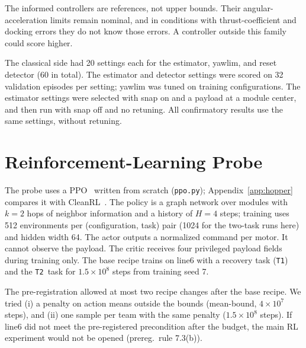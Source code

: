 \documentclass[conference]{IEEEtran}
\newcommand{\TT}{\texttt{T2}}
\begin{document}
The informed controllers are references, not upper bounds.
Their angular-acceleration limits remain nominal, and in conditions with thrust-coefficient and docking errors they do not know those errors. %
A controller outside this family could score higher.

The classical side had 20 settings each for the estimator, yawlim, and reset detector (60 in total). %
The estimator and detector settings were scored on 32 validation episodes per setting; yawlim was tuned on training configurations. %
The estimator settings were selected with snap on and a payload at a module center, and then run with snap off and no retuning. %
All confirmatory results use the same settings, without retuning. %

\section{Reinforcement-Learning Probe}\label{sec:rl}
The probe uses a PPO~\cite{schulman2017proximal} written from scratch (\texttt{ppo.py}); Appendix~\ref{app:hopper} compares it with CleanRL~\cite{huang2022cleanrl}.
The policy is a graph network over modules with $k=2$ hops of neighbor information and a history of $H=4$ steps; training uses 512 environments per (configuration, task) pair (1024 for the two-task runs here) and hidden width 64. %
The actor outputs a normalized command per motor. %
It cannot observe the payload.
The critic receives four privileged payload fields during training only. %
The base recipe trains on line6 with a recovery task (\texttt{T1}) and the \TT\ task for $1.5\times10^8$ steps from training seed 7. %

The pre-registration allowed at most two recipe changes after the base recipe. %
We tried (i) a penalty on action means outside the bounds (mean-bound, $4\times10^7$ steps), and (ii) one sample per team with the same penalty ($1.5\times10^8$ steps). %
If line6 did not meet the pre-registered precondition after the budget, the main RL experiment would not be opened (prereg.\ rule 7.3(b)). %
\end{document}
